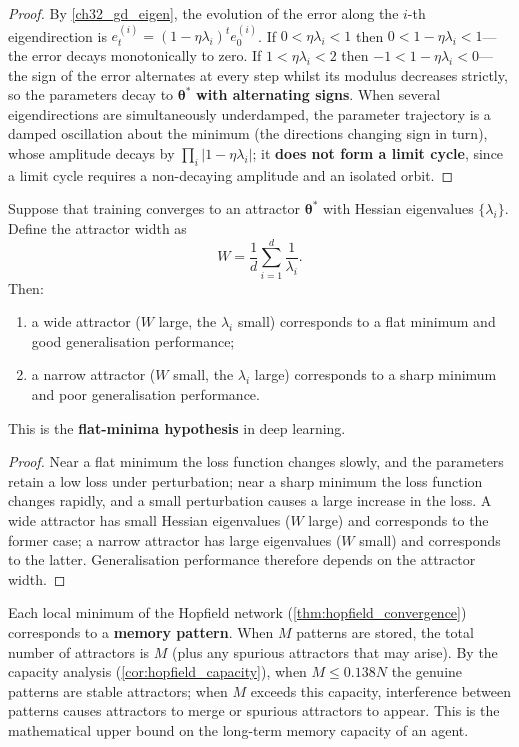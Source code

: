 \begin{proof}
By \cref{ch32_gd_eigen}, the evolution of the error along the $i$-th eigendirection is $e_t^{(i)}=(1-\eta\lambda_i)^te_0^{(i)}$. If $0<\eta\lambda_i<1$ then $0<1-\eta\lambda_i<1$---the error decays monotonically to zero. If $1<\eta\lambda_i<2$ then $-1<1-\eta\lambda_i<0$---the sign of the error alternates at every step whilst its modulus decreases strictly, so the parameters decay to $\boldsymbol{\theta}^*$ \textbf{with alternating signs}. When several eigendirections are simultaneously underdamped, the parameter trajectory is a damped oscillation about the minimum (the directions changing sign in turn), whose amplitude decays by $\prod_i|1-\eta\lambda_i|$; it \textbf{does not form a limit cycle}, since a limit cycle requires a non-decaying amplitude and an isolated orbit.
\end{proof}

\begin{proposition}\label{prop:generalisation_attractor_width}
Suppose that training converges to an attractor $\boldsymbol{\theta}^*$ with Hessian eigenvalues $\{\lambda_i\}$. Define the attractor width as
\[
W=\frac{1}{d}\sum_{i=1}^{d}\frac{1}{\lambda_i}.
\]
Then:
\begin{enumerate}[label=(\roman*)]
    \item a wide attractor ($W$ large, the $\lambda_i$ small) corresponds to a flat minimum and good generalisation performance;
    \item a narrow attractor ($W$ small, the $\lambda_i$ large) corresponds to a sharp minimum and poor generalisation performance.
\end{enumerate}
This is the \textbf{flat-minima hypothesis} in deep learning.
\end{proposition}

\begin{proof}
Near a flat minimum the loss function changes slowly, and the parameters retain a low loss under perturbation; near a sharp minimum the loss function changes rapidly, and a small perturbation causes a large increase in the loss. A wide attractor has small Hessian eigenvalues ($W$ large) and corresponds to the former case; a narrow attractor has large eigenvalues ($W$ small) and corresponds to the latter. Generalisation performance therefore depends on the attractor width.
\end{proof}

\begin{example}\label{ex:pattern_memory}
Each local minimum of the Hopfield network (\cref{thm:hopfield_convergence}) corresponds to a \textbf{memory pattern}. When $M$ patterns are stored, the total number of attractors is $M$ (plus any spurious attractors that may arise). By the capacity analysis (\cref{cor:hopfield_capacity}), when $M\le0.138N$ the genuine patterns are stable attractors; when $M$ exceeds this capacity, interference between patterns causes attractors to merge or spurious attractors to appear. This is the mathematical upper bound on the long-term memory capacity of an agent.
\end{example}

